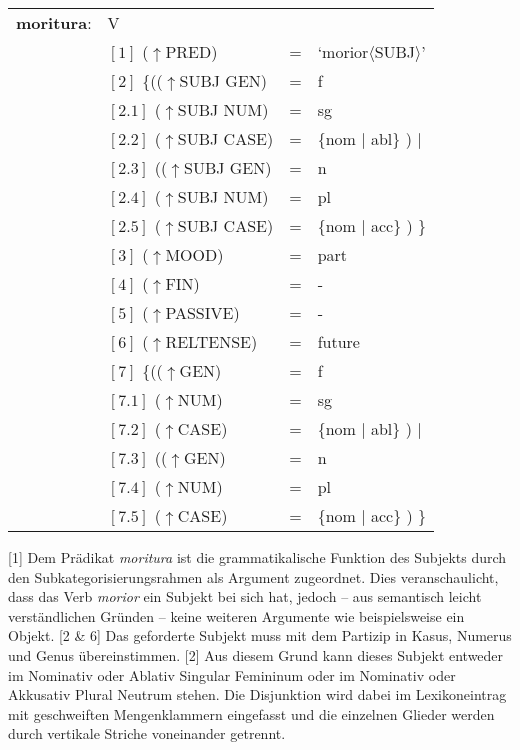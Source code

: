 \documentclass[12pt,a4paper]{article}
\begin{document}
\begin{singlespace}
\begin{tabular}{ l  l  l  l  } 
\textbf{moritura}: & V \\
$\qquad$ & $[1]$ \:  ($\uparrow$PRED) & = & `morior$\langle$SUBJ$\rangle$'\\
$\qquad$ & $[2]$ \:  \{(($\uparrow$SUBJ GEN) & = & f \\ 
$\qquad$ & $[2.1]$ \:  ($\uparrow$SUBJ NUM) & = & sg \\
$\qquad$ & $[2.2]$ \:  ($\uparrow$SUBJ CASE) & = & \{nom $\mid$ abl\} ) $\mid$\\
$\qquad$ & $[2.3]$ \: (($\uparrow$SUBJ GEN) & = & n \\
$\qquad$ & $[2.4]$ \:  ($\uparrow$SUBJ NUM) & = & pl \\
$\qquad$ & $[2.5]$ \:  ($\uparrow$SUBJ CASE) & = & \{nom $\mid$ acc\} ) \}\\
$\qquad$ & $[3]$ \:  ($\uparrow$MOOD) & = & part\\
$\qquad$ & $[4]$ \:  ($\uparrow$FIN) & = & - \\
$\qquad$ & $[5]$ \:  ($\uparrow$PASSIVE) & = & - \\
$\qquad$ & $[6]$ \:  ($\uparrow$RELTENSE) & = & future \\
$\qquad$ & $[7]$ \:  \{(($\uparrow$GEN) & = & f \\ 
$\qquad$ & $[7.1]$ \:  ($\uparrow$NUM) & = & sg \\
$\qquad$ & $[7.2]$ \:  ($\uparrow$CASE) & = & \{nom $\mid$ abl\} ) $\mid$\\
$\qquad$ & $[7.3]$ \: (($\uparrow$GEN) & = & n \\
$\qquad$ & $[7.4]$ \:  ($\uparrow$NUM) & = & pl \\
$\qquad$ & $[7.5]$ \:  ($\uparrow$CASE) & = & \{nom $\mid$ acc\} ) \}\\
\end{tabular}
\newline
\newline
\end{singlespace}

[1] Dem Prädikat \textit{moritura} ist die grammatikalische Funktion des Subjekts durch den Subkategorisierungsrahmen als Argument zugeordnet. Dies veranschaulicht, dass das Verb \textit{morior} ein Subjekt bei sich hat, jedoch -- aus semantisch leicht verständlichen Gründen -- keine weiteren Argumente wie beispielsweise ein Objekt.
[2 \& 6] Das geforderte Subjekt muss mit dem Partizip in Kasus, Numerus und Genus übereinstimmen. [2] Aus diesem Grund kann dieses Subjekt entweder im Nominativ oder Ablativ Singular Femininum oder im Nominativ oder Akkusativ Plural Neutrum stehen. Die Disjunktion wird dabei im Lexikoneintrag mit geschweiften Mengenklammern eingefasst und die einzelnen Glieder werden durch vertikale Striche voneinander getrennt.
\end{document}
